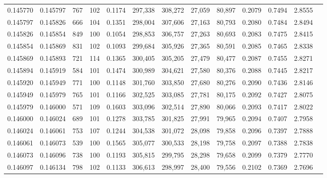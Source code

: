 \begin{tabular}{rrrrrrrrrrrrr}
0.145770 & 0.145797 &   767 & 102 &                                     0.1174 & 297,338 & 308,272 &  27,059 &  80,897 & 0.2079 & 0.7494 & 2.8555 \\
0.145797 & 0.145826 &   666 & 104 &                                     0.1351 & 298,004 & 307,606 &  27,163 &  80,793 & 0.2080 & 0.7484 & 2.8494 \\
0.145826 & 0.145854 &   849 & 100 &                                     0.1054 & 298,853 & 306,757 &  27,263 &  80,693 & 0.2083 & 0.7475 & 2.8415 \\
0.145854 & 0.145869 &   831 & 102 &                                     0.1093 & 299,684 & 305,926 &  27,365 &  80,591 & 0.2085 & 0.7465 & 2.8338 \\
0.145869 & 0.145893 &   721 & 114 &                                     0.1365 & 300,405 & 305,205 &  27,479 &  80,477 & 0.2087 & 0.7455 & 2.8271 \\
0.145894 & 0.145919 &   584 & 101 &                                     0.1474 & 300,989 & 304,621 &  27,580 &  80,376 & 0.2088 & 0.7445 & 2.8217 \\
0.145920 & 0.145949 &   771 & 100 &                                     0.1148 & 301,760 & 303,850 &  27,680 &  80,276 & 0.2090 & 0.7436 & 2.8146 \\
0.145949 & 0.145979 &   765 & 101 &                                     0.1166 & 302,525 & 303,085 &  27,781 &  80,175 & 0.2092 & 0.7427 & 2.8075 \\
0.145979 & 0.146000 &   571 & 109 &                                     0.1603 & 303,096 & 302,514 &  27,890 &  80,066 & 0.2093 & 0.7417 & 2.8022 \\
0.146000 & 0.146024 &   689 & 101 &                                     0.1278 & 303,785 & 301,825 &  27,991 &  79,965 & 0.2094 & 0.7407 & 2.7958 \\
0.146024 & 0.146061 &   753 & 107 &                                     0.1244 & 304,538 & 301,072 &  28,098 &  79,858 & 0.2096 & 0.7397 & 2.7888 \\
0.146061 & 0.146073 &   539 & 100 &                                     0.1565 & 305,077 & 300,533 &  28,198 &  79,758 & 0.2097 & 0.7388 & 2.7838 \\
0.146073 & 0.146096 &   738 & 100 &                                     0.1193 & 305,815 & 299,795 &  28,298 &  79,658 & 0.2099 & 0.7379 & 2.7770 \\
0.146097 & 0.146134 &   798 & 102 &                                     0.1133 & 306,613 & 298,997 &  28,400 &  79,556 & 0.2102 & 0.7369 & 2.7696 \\

\end{tabular}

